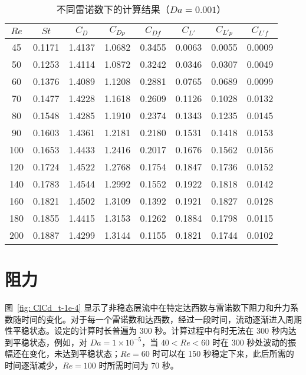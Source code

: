 \begin{table}
	\caption{不同雷诺数下的计算结果（$Da=0.001$）}\label{tab: results-1e-3}
	\vspace{.2em}\centering\wuhao
	\begin{tabular}{*{8}{c}}
		\toprule[1.5pt]
		$Re$ & $St$ & $C_D$ & $C_{Dp}$ & $C_{Df}$ & $C_{L'}$ & $C_{L'p}$ & $C_{L'f}$ \\
		\midrule[1pt]
		45  & 0.1171 & 1.4137 & 1.0682 & 0.3455 & 0.0063 & 0.0055 & 0.0009 \\
		50  & 0.1253 & 1.4114 & 1.0872 & 0.3242 & 0.0346 & 0.0307 & 0.0049 \\
		60  & 0.1376 & 1.4089 & 1.1208 & 0.2881 & 0.0765 & 0.0689 & 0.0099 \\
		70  & 0.1477 & 1.4228 & 1.1618 & 0.2609 & 0.1126 & 0.1028 & 0.0132 \\
		80  & 0.1548 & 1.4285 & 1.1910 & 0.2374 & 0.1343 & 0.1235 & 0.0145 \\
		90  & 0.1603 & 1.4361 & 1.2181 & 0.2180 & 0.1531 & 0.1418 & 0.0153 \\
		100 & 0.1653 & 1.4433 & 1.2416 & 0.2017 & 0.1676 & 0.1562 & 0.0156 \\
		120 & 0.1724 & 1.4522 & 1.2768 & 0.1754 & 0.1847 & 0.1736 & 0.0152 \\
		140 & 0.1783 & 1.4544 & 1.2992 & 0.1552 & 0.1922 & 0.1818 & 0.0142 \\
		160 & 0.1821 & 1.4502 & 1.3109 & 0.1392 & 0.1921 & 0.1827 & 0.0128 \\
		180 & 0.1855 & 1.4415 & 1.3153 & 0.1262 & 0.1884 & 0.1798 & 0.0115 \\
		200 & 0.1887 & 1.4299 & 1.3144 & 0.1155 & 0.1821 & 0.1744 & 0.0102 \\
		\bottomrule[1.5pt]
	\end{tabular}
\end{table}

\section{阻力}\label{sec: drag}

图~\ref{fig: ClCd_t-1e-4} 显示了非稳态层流中在特定达西数与雷诺数下阻力和升力系数随时间的变化。对于每一个雷诺数和达西数，经过一段时间，流动逐渐进入周期性平稳状态。设定的计算时长普遍为 300 秒。计算过程中有时无法在 300 秒内达到平稳状态，例如，对 $Da=1\times 10^{-5}$，当 $40<Re<60$ 时在 300 秒处波动的振幅还在变化，未达到平稳状态；$Re=60$ 时可以在 150 秒稳定下来，此后所需的时间逐渐减少，$Re=100$ 时所需时间为 70 秒。

